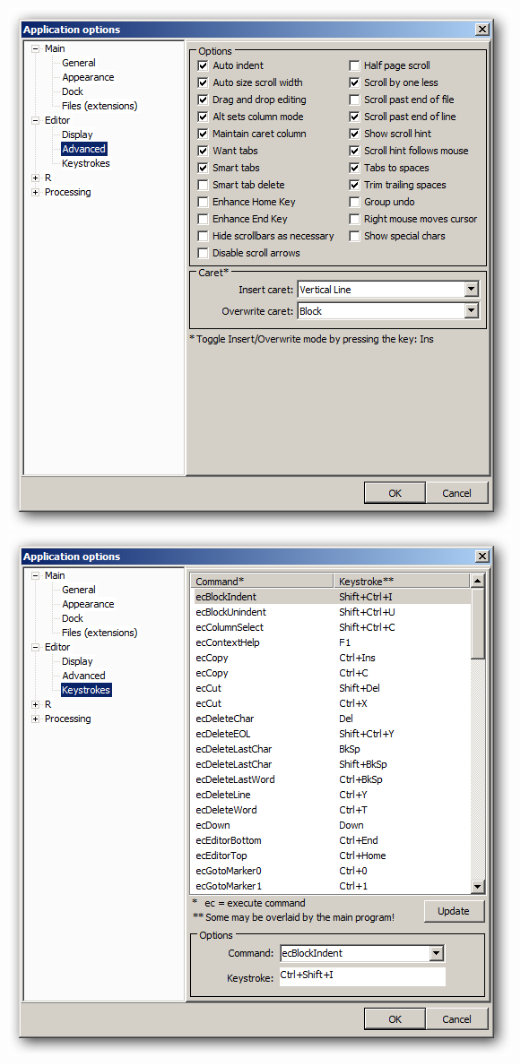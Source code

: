 \includegraphics[scale=0.50]{./res/app_editor_advanced.png}
\includegraphics[scale=0.50]{./res/app_editor_keystrokes.png}


